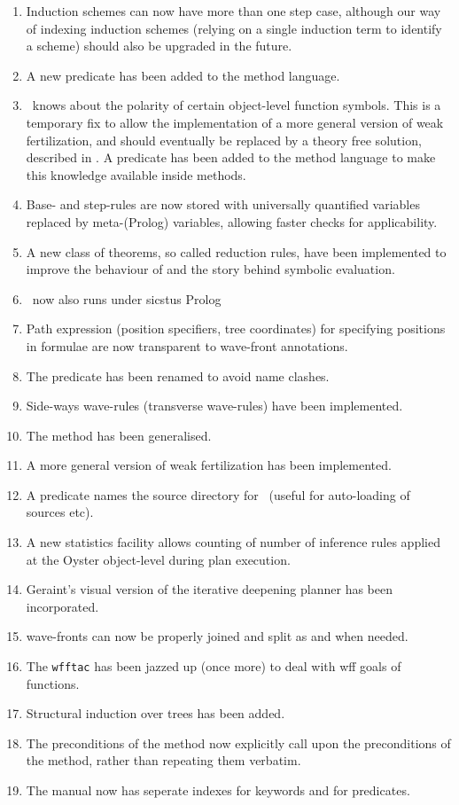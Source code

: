 \begin{enumerate}
\item
Induction schemes can now have more than one step case, although our
way of indexing induction schemes (relying on a single induction term
to identify a scheme) should also be upgraded in the future.
\item
A new predicate  has been added to the method
language.
\item
\clam\ knows about the polarity of certain object-level function
symbols. This is a temporary fix to allow the implementation of a more
general version of weak fertilization, and should eventually be
replaced by a theory free solution, described in 
. A  predicate has been added to
the method language to make this knowledge available inside methods. 
\item
Base- and step-rules are now stored with universally quantified
variables replaced by meta-(Prolog) variables, allowing faster checks
for applicability.
\item
A new class of theorems, so called reduction rules, have been
implemented to improve the behaviour of and the story behind symbolic
evaluation. 
\item
\clam\ now also runs under {\sc sics}tus Prolog
\item
Path expression (position specifiers, tree coordinates) for specifying
positions in formulae are now transparent to wave-front annotations. 
\item
The predicate  has been renamed  to avoid
name clashes. 
\item
Side-ways wave-rules (transverse wave-rules) have been implemented.
\item
The  method has been generalised.
\item
A more general version of weak fertilization has been implemented.
\item
A predicate  names the source directory for \clam\
(useful for auto-loading of sources etc).
\item
A new statistics facility allows counting of number of inference rules
applied at the Oyster object-level during plan execution.
\item
Geraint's visual version of the iterative deepening planner has been
incorporated.
\item
wave-fronts can now be properly joined and split as and when needed.
\item
The {\tt wfftac} has been jazzed up (once more) to deal with wff
goals of functions.
\item
Structural induction over trees has been added.
\item
The preconditions of the  method now explicitly call
upon the preconditions of the \m{induction/2} method, rather than
repeating them verbatim.
\item
The manual now has seperate indexes for keywords and for predicates. 
\end{enumerate}

